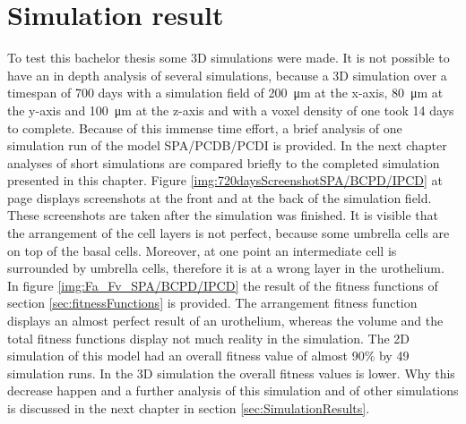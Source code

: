 \section{Simulation result}
To test this bachelor thesis some 3D simulations were made. It is not possible to have an in depth analysis of several simulations, because a 3D simulation over a timespan of 700 days with a simulation field of \SI{200}{\micro\metre} at the x-axis, \SI{80}{\micro\metre} at the y-axis and \SI{100}{\micro\metre} at the z-axis and with a voxel density of one took 14 days to complete. Because of this immense time effort, a brief analysis of one simulation run of the model SPA/PCDB/PCDI is provided. In the next chapter analyses of short simulations are compared briefly to the completed simulation presented in this chapter. \newline
Figure \ref{img:720daysScreenshotSPA/BCPD/IPCD} at page \pageref{img:720daysScreenshotSPA/BCPD/IPCD} displays screenshots at the front and at the back of the simulation field. These screenshots are taken after the simulation was finished. It is visible that the arrangement of the cell layers is not perfect, because some umbrella cells are on top of the basal cells. Moreover, at one point an intermediate cell is surrounded by umbrella cells, therefore it is at a wrong layer in the urothelium. \newline
In figure \ref{img:Fa_Fv_SPA/BCPD/IPCD} the result of the fitness functions of section \ref{sec:fitnessFunctions} is provided. The arrangement fitness function displays an almost perfect result of an urothelium, whereas the volume and the total fitness functions display not much reality in the simulation. The 2D simulation of this model had an overall fitness value of almost 90\% by 49 simulation runs. In the 3D simulation the overall fitness values is lower. Why this decrease happen and a further analysis of this simulation and of other simulations is discussed in the next chapter in section \ref{sec:SimulationResults}.

